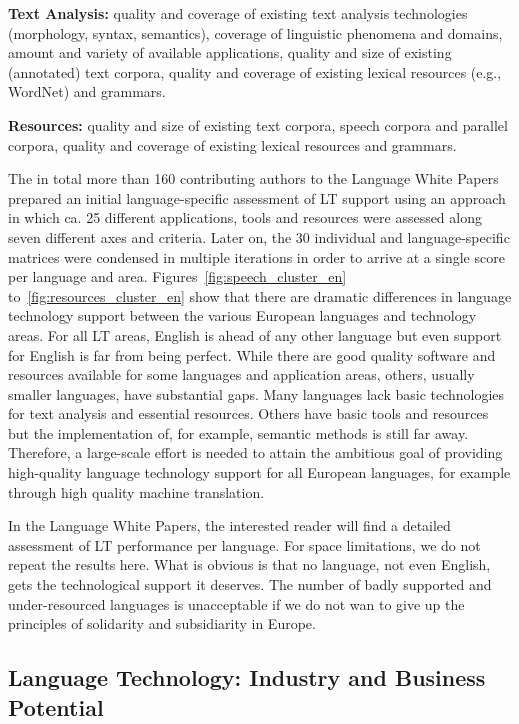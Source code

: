 \begin{multicols}{2}
\textbf{Text Analysis:} quality and coverage of existing text analysis technologies (morphology, syntax, semantics), coverage of linguistic phenomena and domains, amount and variety of available applications, quality and size of existing (annotated) text corpora, quality and coverage of existing lexical resources (e.g., WordNet) and grammars.

\textbf{Resources:} quality and size of existing text corpora, speech corpora and parallel corpora, quality and coverage of existing lexical resources and grammars.

The in total more than 160 contributing authors to the Language White Papers prepared an initial language-specific assessment of LT support using an approach in which ca. 25 different applications, tools and resources were assessed along seven different axes and criteria. Later on, the 30 individual and language-specific matrices were condensed in multiple iterations in order to arrive at a single score per language and area. Figures~\ref{fig:speech_cluster_en} to~\ref{fig:resources_cluster_en} show that there are dramatic differences in language technology support between the various European languages and technology areas. For all LT areas, English is ahead of any other language but even support for English is far from being perfect. While there are good quality software and resources available for some languages and application areas, others, usually smaller languages, have substantial gaps. Many languages lack basic technologies for text analysis and essential resources. Others have basic tools and resources but the implementation of, for example, semantic methods is still far away. Therefore, a large-scale effort is needed to attain the ambitious goal of providing high-quality language technology support for all European languages, for example through high quality machine translation.

In the 	Language White Papers, the interested reader will find a detailed assessment of LT performance per language. For space limitations, we do not repeat the results here. What is obvious is that no language, not even English, gets the technological support it deserves. The number of badly supported and under-resourced languages is unacceptable if we do not wan to give up the principles of solidarity and subsidiarity in Europe.

\subsection{Language Technology: Industry and Business Potential}
\label{sec:lang-techn-industry}


\end{multicols}
